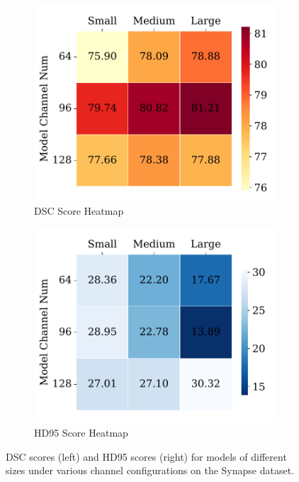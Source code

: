 \documentclass[sn-mathphys-num]{sn-jnl}
\theoremstyle{thmstyleone}%
\theoremstyle{thmstyletwo}%
\theoremstyle{thmstylethree}%
\begin{document}
\begin{figure}[h]
    \centering
    \begin{subfigure}[b]{0.49\textwidth}
        \centering
        \includegraphics[width=\textwidth]{figure9.pdf}  %
        \caption{DSC Score Heatmap}
    \end{subfigure}
    \hfill
    \begin{subfigure}[b]{0.49\textwidth}
        \centering
        \includegraphics[width=\textwidth]{figure10.pdf}  %
        \caption{HD95 Score Heatmap}
    \end{subfigure}
    
    \caption{DSC scores (left) and HD95 scores (right) for models of different sizes under various channel configurations on the Synapse dataset.}
    \label{fig9}
\end{figure}
    
\end{document}
